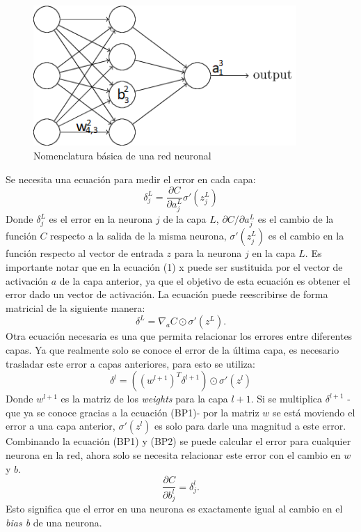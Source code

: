 \documentclass[12pt,spanish]{article}
\begin{document}
	\begin{figure}[H]
		\centering
		\includegraphics[width=10cm]{Imagenes/neural_network_nomenclature.png}
		\begin{centering}
			\caption{Nomenclatura básica de una red neuronal}
		\end{centering}
	\end{figure}
	Se necesita una ecuación para medir el error en cada capa:
	\[ \delta^L_j = \frac{\partial{C}}{\partial{a^L_j}}\sigma'(z^L_j) \tag{BP1}\]
	Donde $\delta^L_j$ es el error en la neurona $j$ de la capa $L$, $\partial{C}/\partial{a^L_j}$ es el cambio de la función $C$ respecto a la salida de la misma neurona, $\sigma'(z^L_j)$ es el cambio en la función  respecto al vector de entrada $z$ para la neurona $j$ en la capa $L$. Es importante notar que en la ecuación (1) x puede ser sustituida por el vector de activación $a$ de la capa anterior, ya que el objetivo de esta ecuación es obtener el error dado un vector de activación. La ecuación puede reescribirse de forma matricial de la siguiente manera:
	\[ \delta^L = \nabla_a C \odot \sigma'(z^L). \tag{BP1a} \]
	Otra ecuación necesaria es una que permita relacionar los errores entre diferentes capas. Ya que realmente solo se conoce el error de la última capa, es necesario trasladar este error a capas anteriores, para esto se utiliza:
	\[ \delta^l = ((w^{l+1})^T \delta^{l+1}) \odot \sigma'(z^l)	\tag{BP2} \]
	Donde $w^{l+1}$ es la matriz de los \textit{weights} para la capa $l+1$. Si se multiplica $\delta^{l+1}$ -que ya se conoce gracias a la ecuación (BP1)- por la matriz $w$ se está moviendo el error a una capa anterior, $\sigma'(z^l)$ es solo para darle una magnitud a este error.\\
	Combinando la ecuación (BP1) y (BP2) se puede calcular el error para cualquier neurona en la red, ahora solo se necesita relacionar este error con el cambio en $w$ y $b$.
	\[ \frac{\partial C}{\partial b^l_j} =	\delta^l_j.	\tag{BP3} \]
	Esto significa que el error en una neurona es exactamente igual al cambio en el \textit{bias b} de una neurona.\\
\end{document}

